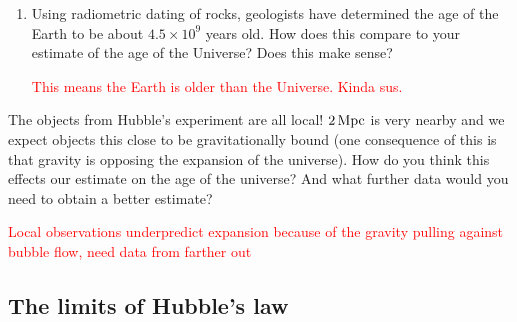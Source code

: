 \documentclass[11pt]{article}
\begin{document}
\begin{enumerate}
\begin{enumerate}
        \textcolor{red}{$2.1 \times 10^9$ years or 2.1 Gyrs.  This is small.}
        
        \item Using radiometric dating of rocks, geologists have determined the age of the Earth to be about $4.5 \times 10^9$ years old. How does this compare to your estimate of the age of the Universe? Does this make sense?
        
        \textcolor{red}{This means the Earth is older than the Universe.  Kinda sus.}

       
    \end{enumerate}
\end{enumerate}

 \item [4 pts] The objects from Hubble's experiment are all local! $2\,\rm{Mpc}$ is very nearby and we expect objects this close to be gravitationally bound (one consequence of this is that gravity is opposing the expansion of the universe). How do you think this effects our estimate on the age of the universe? And what further data would you need to obtain a better estimate?

        \textcolor{red}{Local observations underpredict expansion because of the gravity pulling against bubble flow, need data from farther out}

\subsection{The limits of Hubble's law}
\end{document}
